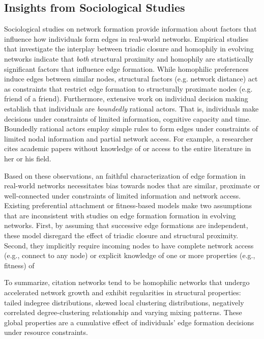 \subsection{Insights from Sociological Studies}

Sociological studies on network formation provide information about factors that
influence how individuals form edges in real-world networks.
Empirical studies
\cite{35626,block2014multidimensional} that investigate
the interplay between triadic closure and homophily in evolving networks
indicate that \textit{both} structural proximity and homophily are statistically
significant factors that influence edge formation. While homophilic preferences
\cite{mcpherson2001birds} induce edges between similar nodes,
structural factors (e.g. network distance) act as constraints that restrict
edge formation to structurally proximate nodes (e.g. friend of a friend).
Furthermore, extensive work \cite{simon1972theories,gigerenzer1996reasoning,lipman1995information}
on individual decision making establish that individuals are \textit{boundedly}
rational actors. That is, individuals make decisions under constraints of limited
information, cognitive capacity and time. Boundedly rational actors employ simple rules
to form edges under constraints of limited nodal information and partial network access.
For example, a researcher cites academic papers without knowledge of or access
to the entire literature in her or his field.

Based on these observations, an faithful characterization of edge formation in real-world
networks necessitates bias towards nodes that are similar, proximate or
well-connected under constraints of limited information and network access.
Existing preferential attachment or fitness-based models
\cite{dorogovtsev2000structure,kim2017effect,singh2017relay,barabasi1999emergence}
make two assumptions that are inconsistent with studies on edge formation formation
in evolving networks.
First, by assuming that successive edge formations are independent, these model
disregard the effect of triadic closure and structural proximity. Second, they
implicitly require incoming nodes to have complete network access (e.g., connect
to any node) or explicit knowledge of one or more properties (e.g., fitness) of

To summarize, citation networks tend to be homophilic networks that
undergo accelerated network growth and exhibit regularities in structural
properties: tailed indegree distributions, skewed local clustering distributions,
negatively correlated degree-clustering relationship and varying mixing patterns. These global properties
are a cumulative effect of individuals' edge formation decisions under resource
constraints.

